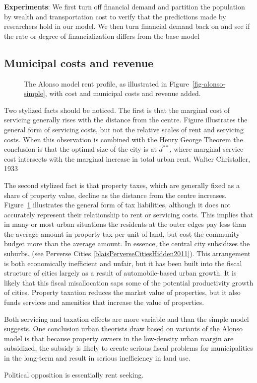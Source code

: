 \textbf{Experiments}: We first turn off financial  demand and partition the population by wealth and transportation cost to  verify that the predictions made by researchers hold in our model. We then turn financial demand back on  and see if the rate or degree of financialization differs from the base model


\subsection{Municipal costs and revenue}

\begin{figure}
\begin{center}

\end{center}
\caption[The Alonso model with municipal costs and revenue.]{The Alonso model \gls{rent profile}, as illustrated in Figure~\ref{fig-alonso-simple}, with cost and municipal costs and revenue added.} %
\label{fig-municipal-costs}
\end{figure}
 

 Two stylized facts should be noticed. The first is that the marginal cost of servicing generally rises with the distance from the centre. Figure illustrates the general form of servicing costs, but not the relative scales of rent and servicing costs. When this observation is combined with the \gls{Henry George Theorem} the conclusion is that the optimal size of the city  is at  $d^{**}$, where marginal service cost intersects with the marginal increase in total urban rent.  Walter Christaller, 1933

The second stylized fact is that property taxes, which are generally  fixed as a share of property value, decline as the distance from the centre increases. Figure~\ref{fig-municipal-costs} illustrates the general form of tax liabilities, although it does not  accurately represent their relationship to rent or  servicing costs. This implies that in many or most urban situations the residents at the outer edges pay less than the average amount in property tax per unit of land, but cost  the community budget more than the average amount. In essence, the central city subsidizes the suburbs. (see Perverse Cities \ref{blaisPerverseCitiesHidden2011}). This arrangement is both economically inefficient and unfair, but it has been built into the fiscal structure of cities largely as a result of automobile-based urban growth. It is likely that this fiscal misallocation saps some of the potential productivity growth of cities. Property taxation reduces the market value of properties, but it also funds services and amenities that increase the value of properties. 

Both servicing and taxation effects are more variable and than the simple model suggests.  One conclusion urban theorists draw based on variants of the Alonso model is that because property owners in the low-density urban margin are subsidized,  the subsidy is likely to create serious fiscal problems for municipalities in the long-term and result in serious inefficiency in land use.

Political opposition is essentially rent seeking.

